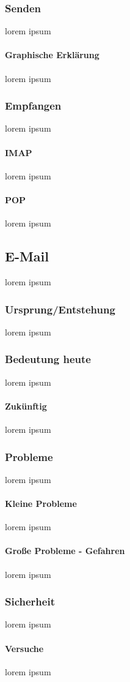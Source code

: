 \documentclass[10pt,a4paper]{report}
\begin{document}
\subsubsection{Senden}
lorem ipsum
\paragraph{Graphische Erklärung}
lorem ipsum
\subsubsection{Empfangen}
lorem ipsum
\paragraph{IMAP}
lorem ipsum
\paragraph{POP}
lorem ipsum
\subsection{E-Mail}
lorem ipsum
\subsubsection{Ursprung/Entstehung}
lorem ipsum
\subsubsection{Bedeutung heute}
lorem ipsum
\paragraph{Zukünftig}
lorem ipsum
\subsubsection{Probleme}
lorem ipsum
\paragraph{Kleine Probleme}
lorem ipsum
\paragraph{Große Probleme - Gefahren}
lorem ipsum
\subsubsection{Sicherheit}
lorem ipsum
\paragraph{Versuche}
lorem ipsum
\end{document}
